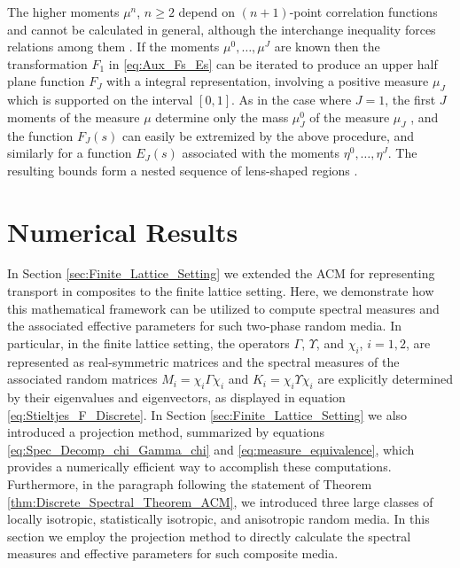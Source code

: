 \documentclass{cmslatex}
\begin{document}
The higher moments $\mu^n$, $n\geq2$ depend on $(n+1)$-point correlation
functions \cite{Golden:CMP-473} and cannot be calculated in general,
although the interchange inequality forces relations among them
\cite{Milton:JAP-5294}. If the moments $\mu^0,\ldots,\mu^J$ are known then the
transformation $F_1$ in \eqref{eq:Aux_Fs_Es} can be iterated to
produce an upper half plane function $F_J$ with a integral
representation, involving a positive measure $\mu_J$ which is supported
on the interval $[0,1]$. As in the case where $J=1$, the first $J$
moments of the measure $\mu$ determine only the mass $\mu_J^0$ of the
measure $\mu_J$ \cite{Golden:1986:BCP}, and the function $F_J(s)$ can
easily be extremized by the above procedure, and similarly for a
function $E_J(s)$ associated with the moments $\eta^0,\ldots,\eta^J$. The
resulting bounds form a nested sequence of lens-shaped regions
\cite{Golden:1986:BCP}.




\section{Numerical Results}\label{sec:Numerical_Results}
%
In Section \ref{sec:Finite_Lattice_Setting} we extended the ACM for
representing transport in composites to the finite lattice
setting. Here, we demonstrate how this mathematical 
framework can be utilized to compute spectral measures and the
associated effective parameters for such two-phase random media. In
particular, in the finite lattice setting, the operators $\Gamma$, $\Upsilon$, and 
$\chi_i$, $i=1,2$, are represented as real-symmetric matrices and the
spectral measures of the associated random matrices $M_i=\chi_i\Gamma\chi_i$ and 
$K_i=\chi_i\Upsilon\chi_i$ are explicitly determined by their eigenvalues and
eigenvectors, as displayed in equation
\eqref{eq:Stieltjes_F_Discrete}. In Section
\ref{sec:Finite_Lattice_Setting} we also introduced a projection method,
summarized by equations \eqref{eq:Spec_Decomp_chi_Gamma_chi} and
\eqref{eq:measure_equivalence}, which provides a numerically efficient
way to accomplish these computations. Furthermore, in the paragraph
following the statement of Theorem
\ref{thm:Discrete_Spectral_Theorem_ACM}, we introduced three large
classes of locally isotropic, statistically isotropic, and anisotropic
random media. In this section we employ the projection method to
directly calculate the spectral measures and effective parameters for
such composite media.
\end{document}
